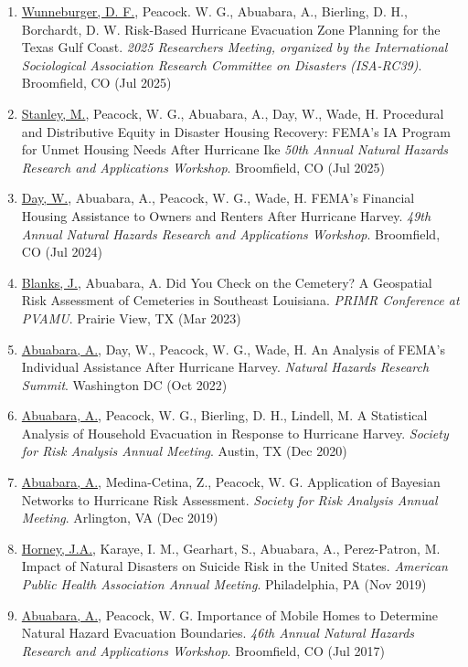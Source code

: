 \documentclass[11pt,oneside]{article}
\begin{document}
\begin{enumerate}[leftmargin=40pt]
\item \underline{Wunneburger, D. F.}, Peacock. W. G., Abuabara, A., Bierling, D. H., Borchardt, D. W. Risk-Based Hurricane Evacuation Zone Planning for the Texas Gulf Coast. \emph{2025 Researchers Meeting, organized by the International Sociological Association Research Committee on Disasters (ISA-RC39)}. Broomfield, CO (Jul 2025)
\item \underline{Stanley, M.}, Peacock, W. G., Abuabara, A., Day, W., Wade, H. Procedural and Distributive Equity in Disaster Housing Recovery: FEMA's IA Program for Unmet Housing Needs After Hurricane Ike \emph{50th Annual Natural Hazards Research and Applications Workshop}. Broomfield, CO (Jul 2025)
\item \underline{Day, W.}, Abuabara, A., Peacock, W. G., Wade, H. FEMA's Financial Housing Assistance to Owners and Renters After Hurricane Harvey. \emph{49th Annual Natural Hazards Research and Applications Workshop}. Broomfield, CO (Jul 2024)
\item \underline{Blanks, J.}, Abuabara, A. Did You Check on the Cemetery? A Geospatial Risk Assessment of Cemeteries in Southeast Louisiana. \emph{PRIMR Conference at PVAMU}. Prairie View, TX (Mar 2023)
\item \underline{Abuabara, A.}, Day, W., Peacock, W. G., Wade, H. An Analysis of FEMA's Individual Assistance After Hurricane Harvey. \emph{Natural Hazards Research Summit}. Washington DC (Oct 2022)
\item \underline{Abuabara, A.}, Peacock, W. G., Bierling, D. H., Lindell, M. A Statistical Analysis of Household Evacuation in Response to Hurricane Harvey. \emph{Society for Risk Analysis Annual Meeting}. Austin, TX (Dec 2020)
\item \underline{Abuabara, A.}, Medina-Cetina, Z., Peacock, W. G. Application of Bayesian Networks to Hurricane Risk Assessment. \emph{Society for Risk Analysis Annual Meeting}. Arlington, VA (Dec 2019)
\item \underline{Horney, J.A.}, Karaye, I. M., Gearhart, S., Abuabara, A., Perez-Patron, M. Impact of Natural Disasters on Suicide Risk in the United States. \emph{American Public Health Association Annual Meeting}. Philadelphia, PA (Nov 2019)
\item \underline{Abuabara, A.}, Peacock, W. G. Importance of Mobile Homes to Determine Natural Hazard Evacuation Boundaries. \emph{46th Annual Natural Hazards Research and Applications Workshop}. Broomfield, CO (Jul 2017)

\end{enumerate}
\end{document}
